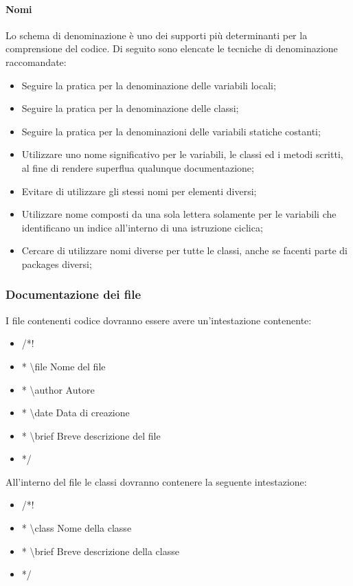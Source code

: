\paragraph{Nomi}
Lo schema di denominazione è uno dei supporti più determinanti per la comprensione del codice.
Di seguito sono elencate le tecniche di denominazione raccomandate:

\begin{itemize}
\item Seguire la pratica  per la denominazione delle variabili locali;
\item Seguire la pratica  per la denominazione delle classi;
\item Seguire la pratica  per la denominazioni delle variabili statiche costanti;
\item Utilizzare uno nome significativo per le variabili, le classi ed i metodi scritti, al fine di rendere superflua qualunque documentazione;
\item Evitare di utilizzare gli stessi nomi per elementi diversi;
\item Utilizzare nome composti da una sola lettera solamente per le variabili che identificano un indice all'interno di una istruzione ciclica;
\item Cercare di utilizzare nomi diverse per tutte le classi, anche se facenti parte di packages diversi;
\end{itemize}
\subsubsection{Documentazione dei file}
I file contenenti codice dovranno essere avere un’intestazione contenente:
\begin{itemize}
\color{ForestGreen}
\item /*! 
\item *   \textbackslash file Nome del file
\item *   \textbackslash author Autore
\item *   \textbackslash date Data di creazione
\item *   \textbackslash brief Breve descrizione del file
\item */
\end{itemize}

All'interno del file le classi dovranno contenere la seguente intestazione:
\begin{itemize}
\color{ForestGreen}
\item /*!
\item * \textbackslash class Nome della classe
\item * \textbackslash brief Breve descrizione della classe
\item */
\end{itemize}

